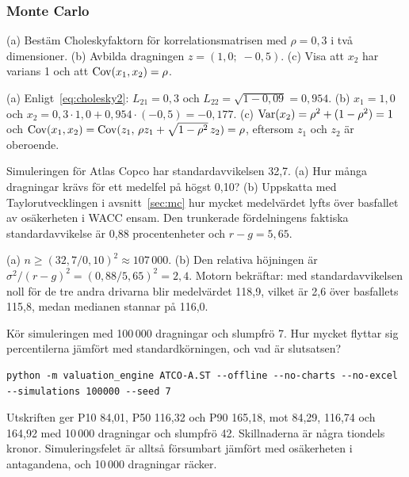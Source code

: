 \subsubsection*{Monte Carlo}

\begin{ovning}
(a) Bestäm Choleskyfaktorn för korrelationsmatrisen med $\rho = 0,3$ i två dimensioner. (b)
Avbilda dragningen $z = (1,0;\; -0,5)$. (c) Visa att $x_2$ har varians 1 och att
$\operatorname{Cov}(x_1, x_2) = \rho$.
\end{ovning}
\begin{losning}
(a) Enligt~\eqref{eq:cholesky2}: $L_{21} = 0,3$ och $L_{22} = \sqrt{1 - 0,09} = 0,954$. (b)
$x_1 = 1,0$ och $x_2 = 0,3 \cdot 1,0 + 0,954 \cdot (-0,5) = -0,177$. (c)
$\operatorname{Var}(x_2) = \rho^2 + (1 - \rho^2) = 1$ och
$\operatorname{Cov}(x_1, x_2) = \operatorname{Cov}(z_1,\, \rho z_1 + \sqrt{1-\rho^2}\, z_2) = \rho$, eftersom $z_1$ och $z_2$
är oberoende.
\end{losning}

\begin{ovning}
Simuleringen för Atlas Copco har standardavvikelsen 32,7\kr. (a) Hur många dragningar krävs
för ett medelfel på högst 0,10\kr? (b) Uppskatta med Taylorutvecklingen i
avsnitt~\ref{sec:mc} hur mycket medelvärdet lyfts över basfallet av osäkerheten i WACC
ensam. Den trunkerade fördelningens faktiska standardavvikelse är 0,88 procentenheter och
$r - g = 5,65$.
\end{ovning}
\begin{losning}
(a) $n \ge (32,7 / 0,10)^2 \approx 107\,000$. (b) Den relativa höjningen är
$\sigma^2/(r-g)^2 = (0,88/5,65)^2 = 2,4$\pct. Motorn bekräftar: med standardavvikelsen noll
för de tre andra drivarna blir medelvärdet 118,9\kr, vilket är 2,6\pct{} över basfallets
115,8, medan medianen stannar på 116,0.
\end{losning}

\begin{ovning}
Kör simuleringen med 100\,000 dragningar och slumpfrö 7. Hur mycket flyttar sig percentilerna
jämfört med standardkörningen, och vad är slutsatsen?
\begin{lstlisting}[style=sh]
python -m valuation_engine ATCO-A.ST --offline --no-charts --no-excel --simulations 100000 --seed 7
\end{lstlisting}
\end{ovning}
\begin{losning}
Utskriften ger P10 84,01, P50 116,32 och P90 165,18, mot 84,29, 116,74 och 164,92 med 10\,000
dragningar och slumpfrö 42. Skillnaderna är några tiondels kronor. Simuleringsfelet är alltså
försumbart jämfört med osäkerheten i antagandena, och 10\,000 dragningar räcker.
\end{losning}

